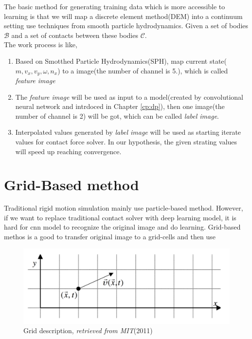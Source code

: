    The basic method for generating training data which is more accessible to learning is that we will map a discrete element method(DEM) into a continuum setting use techniques from smooth particle hydrodynamics. Given a set of bodies $\mathcal{B}$ and a set of contacts between these bodies $\mathcal{C}$. \\
    The work process is like,
    \begin{enumerate}
        \item Based on Smotthed Particle Hydrodynamics(SPH), map current state($m, v_x, v_y, \omega, n_x$) to a image(the number of channel is 5.), which is called \textit{feature image}
        \item The \textit{feature image} will be used as input to a model(created by convolutional neural network and intrdoced in Chapter \ref{cp:dp}), then one image(the number of channel is 2) will be got, which can be called \textit{label image}.
        \item Interpolated values generated by \textit{label image} will be used as starting iterate values for contact force solver. In our hypothesis, the given strating values will speed up reaching convergence.
    \end{enumerate}

\section{Grid-Based method}
    Traditional rigid motion simulation mainly use particle-based method. However, if we want to replace traditional contact solver with deep learning model, it is hard for cnn model to recognize the original image and do learning. Grid-based methos is a good to transfer original image to a grid-cells and then use

    \begin{figure}
        \centering
        \includegraphics[scale = 0.4]{Figures/grid_method.png}
        \caption{Grid description, \textit{retrieved from MIT}(2011)}
    \end{figure}

